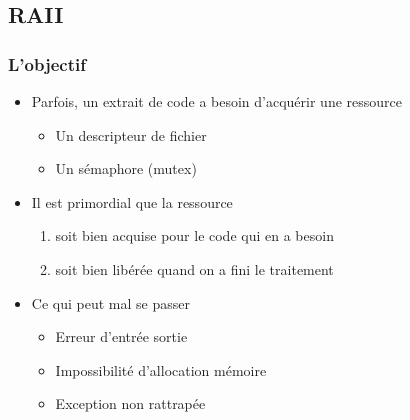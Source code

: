 \subsection{RAII}

\begin{frame}
\frametitle{L'objectif}
\begin{itemize}[<+->]
\item Parfois, un extrait de code a besoin d'acquérir une ressource
	\begin{itemize}
	\item Un descripteur de fichier
	\item Un sémaphore (mutex)
	\end{itemize}
\item Il est primordial que la ressource 
	\begin{enumerate}
	\item soit bien acquise pour le code qui en a besoin
	\item soit bien libérée quand on a fini le traitement
	\end{enumerate}
\item Ce qui peut mal se passer
	\begin{itemize}
	\item Erreur d'entrée sortie
	\item Impossibilité d'allocation mémoire
	\item Exception non rattrapée
	\end{itemize}
\end{itemize}
\end{frame}

